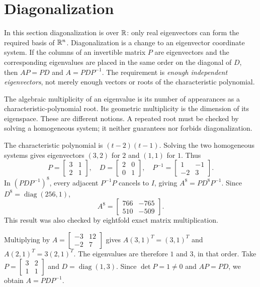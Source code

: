 \section{Diagonalization}
In this section diagonalization is over $\mathbb{R}$: only real eigenvectors can form the required basis of $\mathbb{R}^n$. Diagonalization is a change to an eigenvector coordinate system. If the columns of an invertible matrix $P$ are eigenvectors and the corresponding eigenvalues are placed in the same order on the diagonal of $D$, then $AP=PD$ and $A=PDP^{-1}$. The requirement is \emph{enough independent eigenvectors}, not merely enough vectors or roots of the characteristic polynomial.

The algebraic multiplicity of an eigenvalue is its number of appearances as a characteristic-polynomial root. Its geometric multiplicity is the dimension of its eigenspace. These are different notions. A repeated root must be checked by solving a homogeneous system; it neither guarantees nor forbids diagonalization.

The characteristic polynomial is $(t-2)(t-1)$. Solving the two homogeneous systems gives eigenvectors $(3,2)$ for $2$ and $(1,1)$ for $1$. Thus
\[
P=\begin{bmatrix}3&1\\2&1\end{bmatrix},\quad
D=\begin{bmatrix}2&0\\0&1\end{bmatrix},\quad
P^{-1}=\begin{bmatrix}1&-1\\-2&3\end{bmatrix}.
\]
In $(PDP^{-1})^8$, every adjacent $P^{-1}P$ cancels to $I$, giving $A^8=PD^8P^{-1}$. Since $D^8=\operatorname{diag}(256,1)$,
\[
A^8=\begin{bmatrix}766&-765\\510&-509\end{bmatrix}.
\]
This result was also checked by eightfold exact matrix multiplication.

Multiplying by $A=\left[\begin{smallmatrix}-3&12\\-2&7\end{smallmatrix}\right]$ gives $A(3,1)^T=(3,1)^T$ and $A(2,1)^T=3(2,1)^T$. The eigenvalues are therefore $1$ and $3$, in that order. Take $P=\left[\begin{smallmatrix}3&2\\1&1\end{smallmatrix}\right]$ and $D=\operatorname{diag}(1,3)$. Since $\det P=1\ne0$ and $AP=PD$, we obtain $A=PDP^{-1}$.

